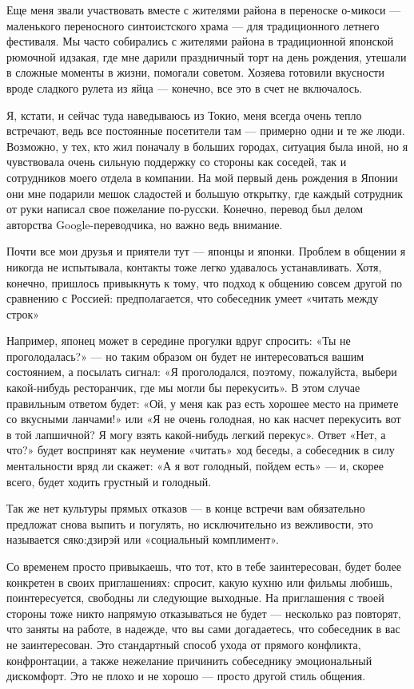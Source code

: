 Еще меня звали участвовать вместе с жителями района в переноске о-микоси — маленького переносного синтоистского храма — для традиционного летнего фестиваля. Мы часто собирались с жителями района в традиционной японской рюмочной идзакая, где мне дарили праздничный торт на день рождения, утешали в сложные моменты в жизни, помогали советом. Хозяева готовили вкусности вроде сладкого рулета из яйца — конечно, все это в счет не включалось.

Я, кстати, и сейчас туда наведываюсь из Токио, меня всегда очень тепло встречают, ведь все постоянные посетители там — примерно одни и те же люди. Возможно, у тех, кто жил поначалу в больших городах, ситуация была иной, но я чувствовала очень сильную поддержку со стороны как соседей, так и сотрудников моего отдела в компании. На мой первый день рождения в Японии они мне подарили мешок сладостей и большую открытку, где каждый сотрудник от руки написал свое пожелание по-русски. Конечно, перевод был делом авторства Google-переводчика, но важно ведь внимание.

\begin{fancyquotes}
    Почти все мои друзья и приятели тут — японцы и японки. Проблем в общении я никогда не испытывала, контакты тоже легко удавалось устанавливать. Хотя, конечно, пришлось привыкнуть к тому, что подход к общению совсем другой по сравнению с Россией: предполагается, что собеседник умеет «читать между строк»
\end{fancyquotes}

Например, японец может в середине прогулки вдруг спросить: «Ты не проголодалась?» — но таким образом он будет не интересоваться вашим состоянием, а посылать сигнал: «Я проголодался, поэтому, пожалуйста, выбери какой-нибудь ресторанчик, где мы могли бы перекусить». В этом случае правильным ответом будет: «Ой, у меня как раз есть хорошее место на примете со вкусными ланчами!» или «Я не очень голодная, но как насчет перекусить вот в той лапшичной? Я могу взять какой-нибудь легкий перекус». Ответ «Нет, а что?» будет воспринят как неумение «читать» ход беседы, а собеседник в силу ментальности вряд ли скажет: «А я вот голодный, пойдем есть» — и, скорее всего, будет ходить грустный и голодный.

Так же нет культуры прямых отказов — в конце встречи вам обязательно предложат снова выпить и погулять, но исключительно из вежливости, это называется сяко:дзирэй или «социальный комплимент».

Со временем просто привыкаешь, что тот, кто в тебе заинтересован, будет более конкретен в своих приглашениях: спросит, какую кухню или фильмы любишь, поинтересуется, свободны ли следующие выходные. На приглашения с твоей стороны тоже никто напрямую отказываться не будет — несколько раз повторят, что заняты на работе, в надежде, что вы сами догадаетесь, что собеседник в вас не заинтересован. Это стандартный способ ухода от прямого конфликта, конфронтации, а также нежелание причинить собеседнику эмоциональный дискомфорт. Это не плохо и не хорошо — просто другой стиль общения.


